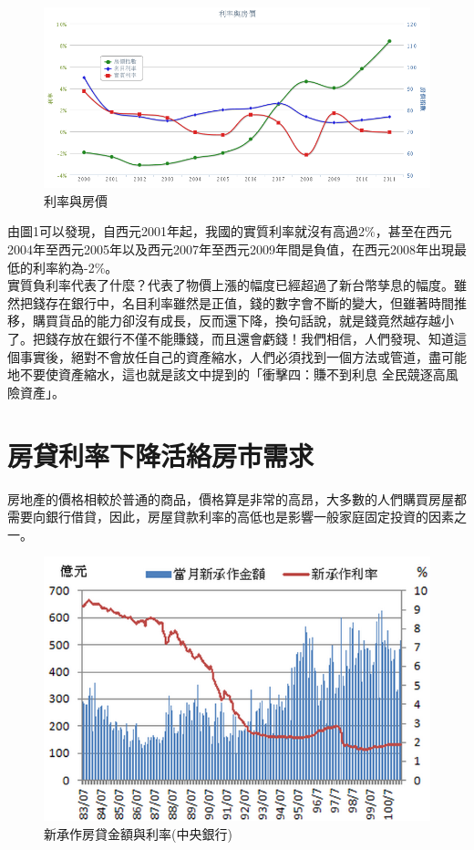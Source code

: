 \documentclass[12pt]{article}
\begin{document}
\begin{CJK}{UTF8}{cwmb}
\begin{figure}[htp]
\centering
\includegraphics[scale=0.45]{01.png}
\caption{利率與房價}
\label{}
\end{figure}

由圖1可以發現，自西元2001年起，我國的實質利率就沒有高過2\%，甚至在西元2004年至西元2005年以及西元2007年至西元2009年間是負值，在西元2008年出現最低的利率約為-2\%。\\

實質負利率代表了什麼？代表了物價上漲的幅度已經超過了新台幣孳息的幅度。雖然把錢存在銀行中，名目利率雖然是正值，錢的數字會不斷的變大，但雖著時間推移，購買貨品的能力卻沒有成長，反而還下降，換句話說，就是錢竟然越存越小了。把錢存放在銀行不僅不能賺錢，而且還會虧錢！我們相信，人們發現、知道這個事實後，絕對不會放任自己的資產縮水，人們必須找到一個方法或管道，盡可能地不要使資產縮水，這也就是該文中提到的「衝擊四：賺不到利息 全民競逐高風險資產」。

\section{房貸利率下降活絡房市需求}

房地產的價格相較於普通的商品，價格算是非常的高昂，大多數的人們購買房屋都需要向銀行借貸，因此，房屋貸款利率的高低也是影響一般家庭固定投資的因素之一。\\

\begin{figure}[htp]
\centering
\includegraphics[scale=0.3]{02.png}
\caption{新承作房貸金額與利率(中央銀行)}
\label{}
\end{figure}


\end{CJK}
\end{document}
